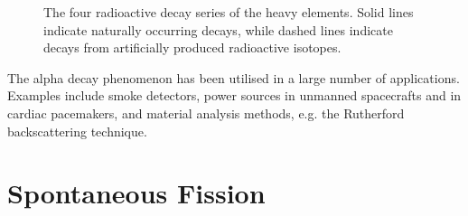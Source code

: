 \documentclass[12pt]{article}
\begin{document}
\begin{figure}
\begin{center}
\caption{The four radioactive decay series of the heavy elements. 
  Solid lines indicate naturally occurring decays, while dashed lines
  indicate decays from artificially produced radioactive isotopes.}
\label{fig:radseries}
\end{center}
\end{figure}

The alpha decay phenomenon has been utilised in a large number of
applications. Examples include smoke detectors, power sources in
unmanned spacecrafts and in cardiac pacemakers, and material analysis
methods, e.g. the Rutherford backscattering technique.

\section*{Spontaneous Fission}
\end{document}
